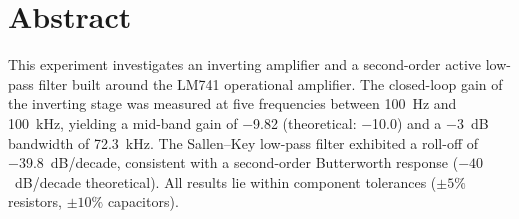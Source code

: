 \section{Abstract}

This experiment investigates an inverting amplifier and a second-order
active low-pass filter built around the LM741 operational amplifier. The
closed-loop gain of the inverting stage was measured at five frequencies
between \qty{100}{\Hz} and \qty{100}{\kHz}, yielding a mid-band gain of
$-$9.82 (theoretical: $-$10.0) and a \qty{-3}{\dB} bandwidth of
\qty{72.3}{\kHz}. The Sallen--Key low-pass filter exhibited a roll-off of
\qty{-39.8}{\dB/decade}, consistent with a second-order Butterworth
response ($-40$~dB/decade theoretical). All results lie within component
tolerances ($\pm5\%$ resistors, $\pm10\%$ capacitors).


